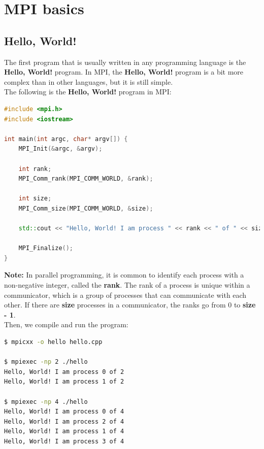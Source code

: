 \section{MPI basics}

\subsection{Hello, World!}

The first program that is usually written in any programming language is the
\textbf{Hello, World!} program. In MPI, the \textbf{Hello, World!} program is a bit more
complex than in other languages, but it is still simple.\\

The following is the \textbf{Hello, World!} program in MPI:

\begin{lstlisting}[language=C++]
#include <mpi.h>
#include <iostream>

int main(int argc, char* argv[]) {
    MPI_Init(&argc, &argv);

    int rank;
    MPI_Comm_rank(MPI_COMM_WORLD, &rank);

    int size;
    MPI_Comm_size(MPI_COMM_WORLD, &size);

    std::cout << "Hello, World! I am process " << rank << " of " << size << std::endl;

    MPI_Finalize();
}
\end{lstlisting}

\vspace{1em}

\textbf{Note:} In parallel programming, it is common to identify each process with a
non-negative integer, called the \textbf{rank}. The rank of a process is unique within
a communicator, which is a group of processes that can communicate with each other. If
there are \textbf{size} processes in a communicator, the ranks go from 0 to \textbf{size - 1}.\\

Then, we compile and run the program:

\begin{lstlisting}[language=bash]
$ mpicxx -o hello hello.cpp

$ mpiexec -np 2 ./hello
Hello, World! I am process 0 of 2
Hello, World! I am process 1 of 2

$ mpiexec -np 4 ./hello
Hello, World! I am process 0 of 4
Hello, World! I am process 2 of 4
Hello, World! I am process 1 of 4
Hello, World! I am process 3 of 4
\end{lstlisting}

